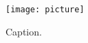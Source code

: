 \documentclass{article}
\begin{document}
      \begin{figure}
             \texttt{[image: picture]}
             \centering
             \caption[Caption]{Caption.}
             \label{pic:Koroshkorosh1}
      \end{figure}
\end{document}
